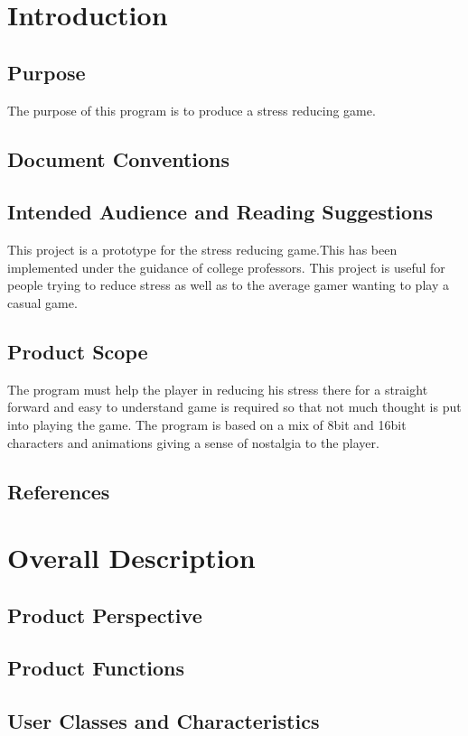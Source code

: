 \chapter{Introduction}
\label{ch:intro}

\section{Purpose}
The purpose of this program is to produce a stress reducing game. 
\section{Document Conventions}
\section{Intended Audience and Reading Suggestions}
This project is a prototype for the stress reducing game.This has been implemented under the guidance of college professors. This project is useful for people trying to reduce stress as well as to the average gamer wanting to play a casual game.
\section{Product Scope}
The program must help the player in reducing his stress there for a straight forward and easy to understand game is required so that not much thought is put into playing the game. The program is based on a mix of 8bit and 16bit characters and animations giving a sense of nostalgia to the player.
\section{References}


\chapter{Overall Description}
\label{Overall Description}

\section{Product Perspective}

\section{Product Functions}


\section{User Classes and Characteristics}


